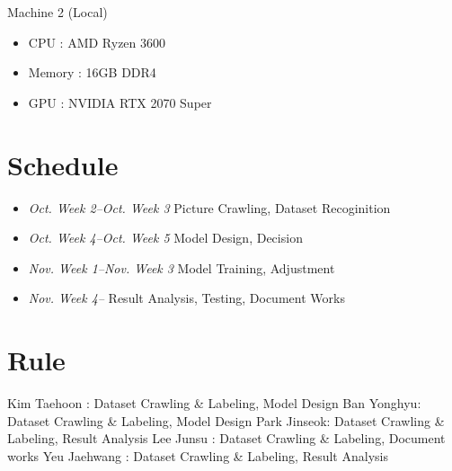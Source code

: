 \documentclass{article}
\begin{document}
Machine 2 (Local)
\begin{itemize}
\item CPU : AMD Ryzen 3600
\item Memory : 16GB DDR4
\item GPU : NVIDIA RTX 2070 Super
\end{itemize}

\section{Schedule}
\begin{itemize}
\item \emph{Oct. Week 2--Oct. Week 3} \newline Picture Crawling, Dataset Recoginition
\item \emph{Oct. Week 4--Oct. Week 5} \newline Model Design, Decision
\item \emph{Nov. Week 1--Nov. Week 3} \newline Model Training, Adjustment
\item \emph{Nov. Week 4--} \newline Result Analysis, Testing, Document Works
\end{itemize}

\section{Rule}
Kim Taehoon : Dataset Crawling \& Labeling, Model Design \newline
Ban Yonghyu: Dataset Crawling \& Labeling, Model Design \newline
Park Jinseok: Dataset Crawling \& Labeling, Result Analysis \newline
Lee Junsu : Dataset Crawling \& Labeling, Document works \newline
Yeu Jaehwang : Dataset Crawling \& Labeling, Result Analysis \newline




\end{document}
